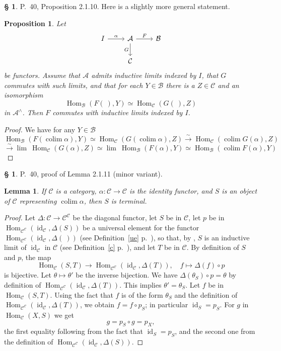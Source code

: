 \documentclass[12pt]{article}
\newtheorem{lem}[thm]{Lemma}
\newtheorem{prop}[thm]{Proposition}
\theoremstyle{remark}
\theoremstyle{definition}
\newtheorem{s}[thm]{\S}
\newcommand{\A}{\mathcal A}
\newcommand{\B}{\mathcal B}
\newcommand{\C}{\mathcal C}
\newcommand{\xr}{\xrightarrow}
\newcommand{\mv}{ (minor variant)}
\DeclareMathOperator*{\coli}{colim}
\DeclareMathOperator*{\co}{colim}
\DeclareMathOperator{\id}{id}
\DeclareMathOperator{\Hom}{Hom}%
\begin{document}
%
%
\begin{s} 
P.~40, Proposition 2.1.10. Here is a slightly more general statement. 
%
\begin{prop}\label{2.1.10}
Let 
$$
\begin{tikzcd}
I\ar{r}{\alpha}&\A\ar{d}[swap]{G}\ar{r}{F}&\B\\
&\C
\end{tikzcd}
$$
be functors. Assume that $\A$ admits inductive limits indexed by $I$, that $G$ commutes with such limits, and that for each $Y\in\B$ there is a $Z\in\C$ and an isomorphism 
$$
\Hom_\B(F(\ ),Y)\simeq\Hom_\C(G(\ ),Z)
$$
in $\A^\wedge$. Then $F$ commutes with inductive limits indexed by $I$.
\end{prop}
%
\begin{proof}
We have for any $Y\in\B$ 
$$ 
\Hom_\B\left(F\left(\coli\alpha\right),Y\right)\simeq
\Hom_\C\left(G\left(\coli\alpha\right),Z\right)
\xr\sim
\Hom_\C\left(\coli G(\alpha),Z\right)
$$
$$
\xr\sim\lim \ \Hom_\C(G(\alpha),Z)\simeq\lim \ \Hom_\B(F(\alpha),Y)\simeq\Hom_\B(\co F(\alpha),Y)
$$
\end{proof}
\end{s}
%
%
\begin{s} 
P.~40, proof of Lemma 2.1.11\mv.
%
\begin{lem} 
If $\C$ is a category, $\alpha:\C\to\C$ is the identity functor, and $S$ is an object of $\C$ representing $\coli\alpha$, then $S$ is terminal. 
\end{lem}
%
\begin{proof}
Let $\Delta:\C\to\C^\C$ be the diagonal functor, let $S$ be in $\C$, let $p$ be in $\Hom_{\C^\C}(\id_\C,\Delta(S))$ be a universal element for the functor $\Hom_{\C^\C}(\id_\C,\Delta(\ ))$ (see Definition~\ref{ue} p.~\pageref{ue}), so that, by , $S$ is an inductive limit of $\id_\C$ in $\C$ (see Definition~\ref{c} p.~\pageref{c}), and let $T$ be in $\C$. By definition of $S$ and $p$, the map 
$$
\Hom_\C(S,T)\to\Hom_{\C^\C}(\id_\C,\Delta(T)),\quad f\mapsto\Delta(f)\circ p 
$$ 
is bijective. Let $\theta\mapsto\theta'$ be the inverse bijection. We have $\Delta(\theta_S)\circ p=\theta$ by definition of $\Hom_{\C^\C}(\id_\C,\Delta(T))$. This implies $\theta'=\theta_S$. Let $f$ be in $\Hom_\C(S,T)$. Using the fact that $f$ is of the form $\theta_S$ and the definition of $\Hom_{\C^\C}(\id_\C,\Delta(T))$, we obtain $f=f\circ p_S$; in particular $\id_S=p_S$. For $g$ in $\Hom_\C(X,S)$ we get 
$$
g=p_S\circ g=p_X,
$$
the first equality following from the fact that $\id_S=p_S$, and the second one from the definition of $\Hom_{\C^\C}(\id_\C,\Delta(S))$.
\end{proof}
\end{s}
\end{document}
